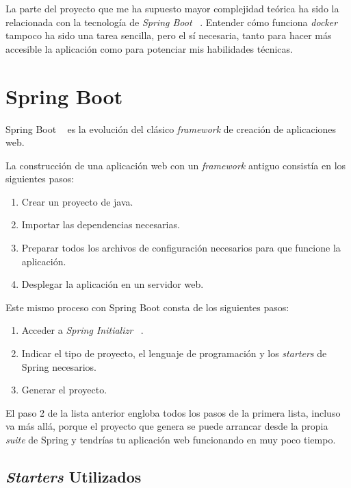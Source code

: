 
La parte del proyecto que me ha supuesto mayor complejidad teórica ha sido la relacionada con la tecnología de \textit{Spring Boot} ~\cite{web:springboot}.
Entender cómo funciona \textit{docker} ~\cite{web:dockerDocs} tampoco ha sido una tarea sencilla, pero el sí necesaria, tanto para hacer más accesible la aplicación como para potenciar mis habilidades técnicas.

\section{Spring Boot}

Spring Boot ~\cite{web:springbootArch} es la evolución del clásico \textit{framework} de creación de aplicaciones web.

La construcción de una aplicación web con un \textit{framework} antiguo consistía en los siguientes pasos:

\begin{enumerate}
	\item Crear un proyecto de java.
	\item Importar las dependencias necesarias.
	\item Preparar todos los archivos de configuración necesarios para que funcione la aplicación.
	\item Desplegar la aplicación en un servidor web.
\end{enumerate}

Este mismo proceso con Spring Boot consta de los siguientes pasos:

\begin{enumerate}
	\item Acceder a \textit{Spring Initializr} ~\cite{web:springinitializr}.
	\item Indicar el tipo de proyecto, el lenguaje de programación y los \textit{starters} \cite{web:springStarters} de Spring necesarios.
	\item Generar el proyecto.
\end{enumerate}

El paso 2 de la lista anterior engloba todos los pasos de la primera lista, incluso va más allá, porque el proyecto que genera se puede arrancar desde la propia \textit{suite} de Spring y tendrías tu aplicación web funcionando en muy poco tiempo.

\subsection{\textit{Starters} Utilizados}

